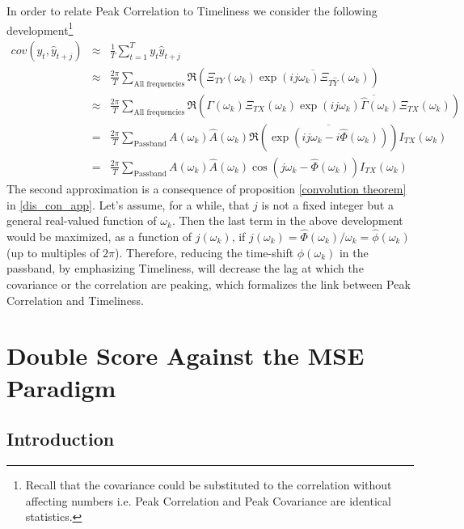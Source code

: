 \documentclass[a4paper]{book}
\begin{document}
In order to relate Peak Correlation to Timeliness we consider the following development\footnote{Recall that the covariance could be substituted to the correlation without affecting numbers i.e. Peak Correlation and Peak Covariance are identical statistics.}
\begin{eqnarray*}
cov(y_t,\widehat{y}_{t+j})&\approx&\frac{1}{T}\sum_{t=1}^Ty_t\hat{y}_{t+j}\\
&\approx&\frac{2\pi}{T}\sum_{\textrm{All~frequencies}} \Re\left(\Xi_{TY}(\omega_k)\overline{\exp(ij\omega_k)\Xi_{T\hat{Y}}(\omega_k)}\right)\\
&\approx&\frac{2\pi}{T}\sum_{\textrm{All~frequencies}}\Re\left(\Gamma(\omega_k)\Xi_{TX}(\omega_k)\overline{\exp(ij\omega_k)\hat{\Gamma}(\omega_k)\Xi_{TX}(\omega_k)}\right)\\
&=&\frac{2\pi}{T}\sum_{\textrm{Passband}}A(\omega_k)\hat{A}(\omega_k) \Re\left(\overline{\exp(ij\omega_k-i\hat{\Phi}(\omega_k))}\right)I_{TX}(\omega_k)\\
&=&\frac{2\pi}{T}\sum_{\textrm{Passband}}A(\omega_k)\hat{A}(\omega_k) \cos(j\omega_k-\hat{\Phi}(\omega_k))I_{TX}(\omega_k)
\end{eqnarray*}
The second approximation is a consequence of proposition \ref{convolution theorem} in \ref{dis_con_app}. Let's assume, for a while, that $j$ is not a fixed integer but a general real-valued function of $\omega_k$. Then the last term in the above development would be maximized, as a function of $j(\omega_k)$, if $j(\omega_k)=\hat{\Phi}(\omega_k)/\omega_k=\hat{\phi}(\omega_k)$ (up to multiples of $2\pi$).  Therefore, reducing the time-shift $\hat{\phi}(\omega_k)$ in the passband, by emphasizing Timeliness, will decrease the lag at which the covariance or the correlation are peaking, which formalizes the link between Peak Correlation and Timeliness. 





\section{Double Score Against the MSE Paradigm}\label{double_score_ats}



\subsection{Introduction}
\end{document}
